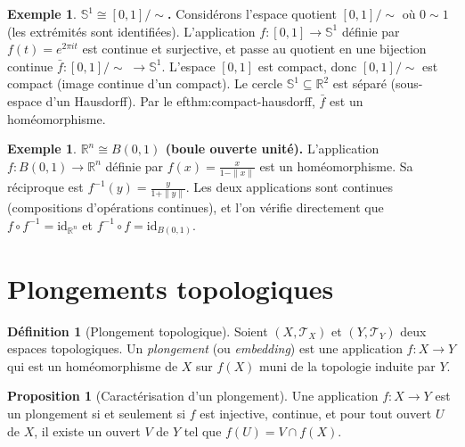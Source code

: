 \documentclass[12pt,a4paper,openany]{book}
\theoremstyle{definition}
\newtheorem{definition}{Définition}[chapter]
\theoremstyle{cours}
\newtheorem{proposition}[theoreme]{Proposition}
\theoremstyle{coursnormal}
\newtheorem{exemple}[theoreme]{Exemple}
\newcommand{\R}{\mathbb{R}}
\newcommand{\T}{\mathcal{T}}
\begin{document}
\begin{exemple}\label{ex:homeo-S1-quotient}
  \textbf{$\mathbb{S}^1\cong[0,1]/\!\!\sim$.}
  Considérons l'espace quotient $[0,1]/\!\!\sim$ où $0\sim 1$ (les
  extrémités sont identifiées). L'application
  $f\colon[0,1]\to\mathbb{S}^1$ définie par $f(t)=e^{2\pi i t}$ est
  continue et surjective, et passe au quotient en une bijection continue
  $\bar{f}\colon[0,1]/\!\!\sim\;\to\mathbb{S}^1$. L'espace $[0,1]$ est
  compact, donc $[0,1]/\!\!\sim$ est compact (image continue d'un compact).
  Le cercle $\mathbb{S}^1\subseteq\R^2$ est séparé (sous-espace d'un
  Hausdorff). Par le 
ef{thm:compact-hausdorff}, $\bar{f}$ est un
  homéomorphisme.
\end{exemple}

\begin{exemple}\label{ex:homeo-Rn}
  \textbf{$\R^n\cong B(0,1)$ (boule ouverte unité).}
  L'application $f\colon B(0,1)\to\R^n$ définie par
  $f(x)=\frac{x}{1-\|x\|}$ est un homéomorphisme. Sa réciproque est
  $f^{-1}(y)=\frac{y}{1+\|y\|}$. Les deux applications sont continues
  (compositions d'opérations continues), et l'on vérifie directement que
  $f\circ f^{-1}=\mathrm{id}_{\R^n}$ et $f^{-1}\circ f=\mathrm{id}_{B(0,1)}$.
\end{exemple}

\section{Plongements topologiques}\label{sec:plongements}

\begin{definition}[Plongement topologique]\label{def:plongement}
  Soient $(X,\T_X)$ et $(Y,\T_Y)$ deux espaces topologiques. Un
  \emph{plongement} (ou
  \emph{embedding}) est une
  application $f\colon X\to Y$ qui est un homéomorphisme de $X$ sur
  $f(X)$ muni de la topologie induite par $Y$.
\end{definition}

\begin{proposition}[Caractérisation d'un plongement]\label{prop:carac-plongement}
  Une application $f\colon X\to Y$ est un plongement si et seulement si $f$
  est injective, continue, et pour tout ouvert $U$ de $X$, il existe un ouvert
  $V$ de $Y$ tel que $f(U)=V\cap f(X)$.
\end{proposition}
\end{document}
